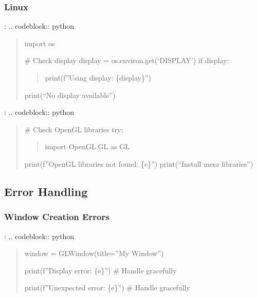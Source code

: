 \documentclass[a4paper,10pt,english,openany,oneside]{sphinxmanual}
\begin{document}
\subsubsection{Linux}
\label{\detokenize{api/ui:linux}}
\sphinxAtStartPar
{}:
.. code\sphinxhyphen{}block:: python
\begin{quote}

\sphinxAtStartPar
import os

\sphinxAtStartPar
\# Check display
display = os.environ.get(‘DISPLAY’)
if display:
\begin{quote}

\sphinxAtStartPar
print(f”Using display: \{display\}”)
\end{quote}
\begin{description}
\sphinxAtStartPar
print(“No display available”)

\end{description}
\end{quote}

\sphinxAtStartPar
{}:
.. code\sphinxhyphen{}block:: python
\begin{quote}

\sphinxAtStartPar
\# Check OpenGL libraries
try:
\begin{quote}

\sphinxAtStartPar
import OpenGL.GL as GL
\end{quote}
\begin{description}
\sphinxAtStartPar
print(f”OpenGL libraries not found: \{e\}”)
print(“Install mesa libraries”)

\end{description}
\end{quote}


\subsection{Error Handling}
\label{\detokenize{api/ui:error-handling}}

\subsubsection{Window Creation Errors}
\label{\detokenize{api/ui:window-creation-errors}}
\sphinxAtStartPar
{}:
.. code\sphinxhyphen{}block:: python
\begin{quote}
\begin{description}
\sphinxAtStartPar
window = GLWindow(title=”My Window”)

\sphinxAtStartPar
print(f”Display error: \{e\}”)
\# Handle gracefully

\sphinxAtStartPar
print(f”Unexpected error: \{e\}”)
\# Handle gracefully

\end{description}
\end{quote}
\end{document}
